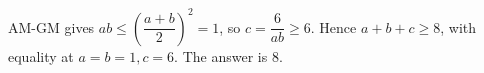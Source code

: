 AM-GM gives $ab\le(\dfrac{a+b}{2})^2=1$, so $c=\dfrac{6}{ab}\ge6$. Hence $a+b+c\ge8$, with equality at $a=b=1,c=6$. The answer is $\boxed8$.
